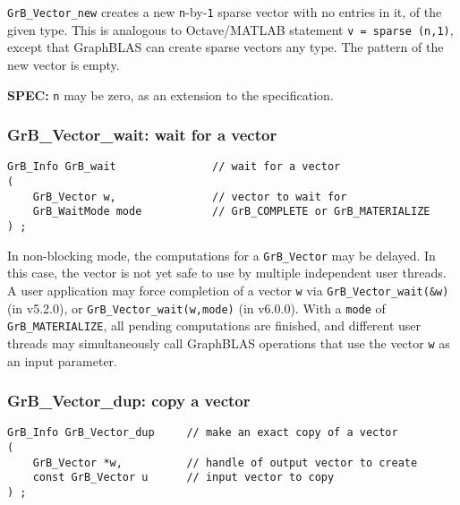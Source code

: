 \documentclass[12pt]{article}
\begin{document}
{\verb'GrB_Vector_new' creates a new \verb'n'-by-\verb'1' sparse vector with no
entries in it, of the given type.  This is analogous to Octave/MATLAB statement
\verb'v = sparse (n,1)', except that GraphBLAS can create sparse vectors any
type.  The pattern of the new vector is empty.

\begin{alert}
{\bf SPEC:} \verb'n' may be zero, as an extension to the specification.
\end{alert}

\subsubsection{{\sf GrB\_Vector\_wait:} wait for a vector}
\label{vector_wait}

\begin{mdframed}[userdefinedwidth=6in]
{\footnotesize
\begin{verbatim}
GrB_Info GrB_wait               // wait for a vector
(
    GrB_Vector w,               // vector to wait for
    GrB_WaitMode mode           // GrB_COMPLETE or GrB_MATERIALIZE
) ;
\end{verbatim}
}\end{mdframed}

In non-blocking mode, the computations for a \verb'GrB_Vector' may be delayed.
In this case, the vector is not yet safe to use by multiple independent user
threads.  A user application may force completion of a vector \verb'w' via
\verb'GrB_Vector_wait(&w)' (in v5.2.0), or
\verb'GrB_Vector_wait(w,mode)' (in v6.0.0).
With a \verb'mode' of \verb'GrB_MATERIALIZE',
all pending computations are finished, and different user threads may
simultaneously call GraphBLAS operations that use the vector \verb'w' as an
input parameter.

\newpage
\subsubsection{{\sf GrB\_Vector\_dup:}           copy a vector}
\label{vector_dup}

\begin{mdframed}[userdefinedwidth=6in]
{\footnotesize
\begin{verbatim}
GrB_Info GrB_Vector_dup     // make an exact copy of a vector
(
    GrB_Vector *w,          // handle of output vector to create
    const GrB_Vector u      // input vector to copy
) ;
\end{verbatim}
} \end{mdframed}

}
\end{document}
